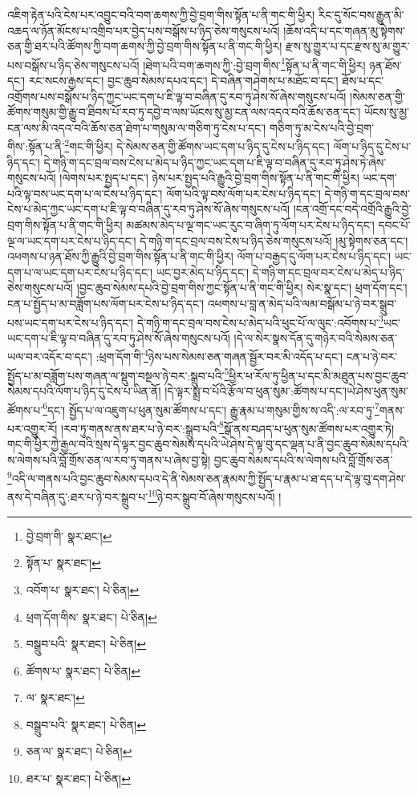 འཇིག་རྟེན་པའི་ངེས་པར་འབྱུང་བའི་བག་ཆགས་ཀྱི་བྱེ་བྲག་གིས་སྟོན་པ་ནི་གང་གི་ཕྱིར། རིང་དུ་སོང་བས་རྒྱུན་མི་འཆད་ལ་ཉོན་མོངས་པ་འགྲིབ་པར་བྱེད་པས་བསྒོས་པ་ཉིད་ཅེས་གསུངས་པའོ། །ཆོས་འདི་པ་དང་གཞན་མུ་སྟེགས་ཅན་གྱི་ཐར་པའི་ཚོགས་ཀྱི་བག་ཆགས་ཀྱི་བྱེ་བྲག་གིས་སྟོན་པ་ནི་གང་གི་ཕྱིར། རྫས་སུ་གྱུར་པ་དང་རྫས་སུ་མ་གྱུར་པས་བསྒོས་པ་ཉིད་ཅེས་གསུངས་པའོ། །ཐེག་པའི་བག་ཆགས་ཀྱི་:བྱེ་བྲག་གིས་\footnote{བྱེ་བྲག་གི་  སྣར་ཐང་། }སྟོན་པ་ནི་གང་གི་ཕྱིར། ཉན་ཐོས་དང་། རང་སངས་རྒྱས་དང་། བྱང་ཆུབ་སེམས་དཔའ་དང་། དེ་བཞིན་གཤེགས་པ་མཐོང་བ་དང་། ཐོས་པ་དང་འགྲོགས་པས་བསྒོས་པ་ཉིད་ཀྱང་ཡང་དག་པ་ཇི་ལྟ་བ་བཞིན་དུ་རབ་ཏུ་ཤེས་སོ་ཞེས་གསུངས་པའོ། །སེམས་ཅན་གྱི་ཚོགས་གསུམ་གྱི་རྒྱུ་བ་ཐིབས་པོ་རབ་ཏུ་དབྱེ་བ་ལས་ཡོངས་སུ་མྱ་ངན་ལས་འདའ་བའི་ཆོས་ཅན་དང་། ཡོངས་སུ་མྱ་ངན་ལས་མི་འདའ་བའི་ཆོས་ཅན་ཐེག་པ་གསུམ་ལ་གཅིག་ཏུ་ངེས་པ་དང་། གཅིག་ཏུ་མ་ངེས་པའི་བྱེ་བྲག་གིས་:སྟོན་པ་ནི་\footnote{སྟོན་པ་  སྣར་ཐང་། }གང་གི་ཕྱིར། དེ་སེམས་ཅན་གྱི་ཚོགས་ཡང་དག་པ་ཉིད་དུ་ངེས་པ་ཉིད་དང་། ལོག་པ་ཉིད་དུ་ངེས་པ་ཉིད་དང་། དེ་གཉི་ག་དང་བྲལ་བས་ངེས་པ་མེད་པ་ཉིད་ཀྱང་ཡང་དག་པ་ཇི་ལྟ་བ་བཞིན་དུ་རབ་ཏུ་ཤེས་ཏེ་ཞེས་གསུངས་པའོ། །ལེགས་པར་སྤྱད་པ་དང་། ཉེས་པར་སྤྱད་པའི་རྒྱུའི་བྱེ་བྲག་གིས་སྟོན་པ་ནི་གང་གི་ཕྱིར། ཡང་དག་པའི་ལྟ་བས་ཡང་དག་པ་ལ་ངེས་པ་ཉིད་དང་། ལོག་པའི་ལྟ་བས་ལོག་པར་ངེས་པ་ཉིད་དང་། དེ་གཉི་ག་དང་བྲལ་བས་ངེས་པ་མེད་ཀྱང་ཡང་དག་པ་ཇི་ལྟ་བ་བཞིན་དུ་རབ་ཏུ་ཤེས་སོ་ཞེས་གསུངས་པའོ། །ངན་འགྲོ་དང་བདེ་འགྲོའི་རྒྱུའི་བྱེ་བྲག་གིས་སྟོན་པ་ནི་གང་གི་ཕྱིར། མཚམས་མེད་པ་ལྔ་གང་ཡང་རུང་བ་ཞིག་ཏུ་ལོག་པར་ངེས་པ་ཉིད་དང་། དབང་པོ་ལྔ་ལ་ཡང་དག་པར་ངེས་པ་ཉིད་དང་། དེ་གཉི་ག་དང་བྲལ་བས་ངེས་པ་ཉིད་ཅེས་གསུངས་པའོ། །མུ་སྟེགས་ཅན་དང་། འཕགས་པ་ཉན་ཐོས་ཀྱི་རྒྱུའི་བྱེ་བྲག་གིས་སྟོན་པ་ནི་གང་གི་ཕྱིར། ལོག་པ་བརྒྱད་དུ་ལོག་པར་ངེས་པ་ཉིད་དང་། ཡང་དག་པ་ལ་ཡང་དག་པར་ངེས་པ་ཉིད་དང་། ཡང་བྱར་མེད་པ་ཉིད་དང་། དེ་གཉི་ག་དང་བྲལ་བར་ངེས་པ་མེད་པ་ཉིད་ཅེས་གསུངས་པའོ། །བྱང་ཆུབ་སེམས་དཔའི་བྱེ་བྲག་གིས་ཀྱང་སྟོན་པ་ནི་གང་གི་ཕྱིར། སེར་སྣ་དང་། ཕྲག་དོག་དང་། ངན་པ་སྤྱོད་པ་མ་བཟློག་པས་ལོག་པར་ངེས་པ་ཉིད་དང་། འཕགས་པ་བླ་ན་མེད་པའི་ལམ་བསྒོམ་པ་ཉེ་བར་སྒྲུབ་པས་ཡང་དག་པར་ངེས་པ་ཉིད་དང་། དེ་གཉི་ག་དང་བྲལ་བས་ངེས་པ་མེད་པའི་ཕུང་པོ་ལ་ལུང་:འབོགས་པ་\footnote{འབོག་པ་  སྣར་ཐང་།  པེ་ཅིན། }ཡང་ཡང་དག་པ་ཇི་ལྟ་བ་བཞིན་དུ་རབ་ཏུ་ཤེས་སོ་ཞེས་གསུངས་པའོ། །དེ་ལ་སེར་སྣས་དོན་དུ་གཉེར་བའི་སེམས་ཅན་ཡལ་བར་འདོར་བ་དང་། :ཕྲག་དོག་གི་\footnote{ཕྲག་དོག་གིས་  སྣར་ཐང་།  པེ་ཅིན། }ཉེས་པས་སེམས་ཅན་གཞན་སྦྱོར་བར་མི་འདོད་པ་དང་། ངན་པ་ཉེ་བར་སྤྱོད་པ་མ་བཟློག་པས་གཞན་ལ་སྡུག་བསྔལ་ཉེ་བར་:སྒྲུབ་པའི་\footnote{བསྒྲུབ་པའི་  སྣར་ཐང་།  པེ་ཅིན། }ཕྱིར་ཕ་རོལ་ཏུ་ཕྱིན་པ་དང་མི་མཐུན་པས་བྱང་ཆུབ་སེམས་དཔའི་ལོག་པ་ཉིད་དུ་ངེས་པ་ཡིན་ནོ། །དེ་ལྟར་སྨྲ་བ་པོའི་རྩོལ་བ་ཕུན་སུམ་:ཚོགས་པ་དང་།ཡེ་ཤེས་ཕུན་སུམ་ཚོགས་པ་\footnote{ཚོགས་པ་  སྣར་ཐང་།  པེ་ཅིན། }དང་། སྤྱོད་པ་ལ་འཇུག་པ་ཕུན་སུམ་ཚོགས་པ་དང་། རྒྱུ་རྣམ་པ་གསུམ་གྱིས་ས་འདི་:ལ་རབ་ཏུ་\footnote{ལ་  སྣར་ཐང་། }གནས་པར་འགྱུར་རོ། །རབ་ཏུ་གནས་ནས་ཐར་པ་ཉེ་བར་:སྒྲུབ་པའི་\footnote{བསྒྲུབ་པའི་  སྣར་ཐང་།  པེ་ཅིན། }སྒོ་ནས་བཤད་པ་ཕུན་སུམ་ཚོགས་པར་འགྱུར་ཏེ། གང་གི་ཕྱིར་ཀྱེ་རྒྱལ་བའི་སྲས་དེ་ལྟར་བྱང་ཆུབ་སེམས་དཔའི་ཡེ་ཤེས་དེ་ལྟ་བུ་དང་ལྡན་པ་ནི་བྱང་ཆུབ་སེམས་དཔའི་ས་ལེགས་པའི་བློ་གྲོས་ཅན་ལ་རབ་ཏུ་གནས་པ་ཞེས་བྱ་སྟེ། བྱང་ཆུབ་སེམས་དཔའི་ས་ལེགས་པའི་བློ་གྲོས་ཅན་\footnote{ཅན་ལ་  སྣར་ཐང་།  པེ་ཅིན། }འདི་ལ་གནས་པའི་བྱང་ཆུབ་སེམས་དཔའ་དེ་ནི་སེམས་ཅན་རྣམས་ཀྱི་སྤྱོད་པ་རྣམ་པ་ཐ་དད་པ་དེ་ལྟ་བུ་དག་ཤེས་ནས་དེ་བཞིན་དུ་:ཐར་པ་ཉེ་བར་སྒྲུབ་པ་\footnote{ཐར་པ་  སྣར་ཐང་།  པེ་ཅིན། }ཉེ་བར་སྒྲུབ་བོ་ཞེས་གསུངས་པའོ། །

